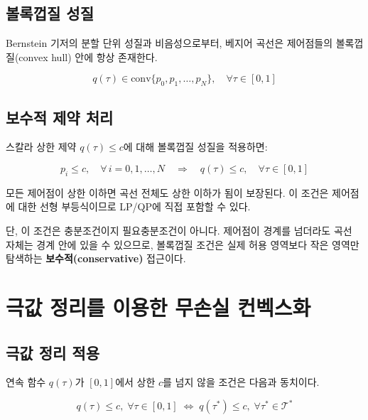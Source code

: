 \documentclass[11pt]{article}
\begin{document}
\subsection{볼록껍질 성질}

Bernstein 기저의 분할 단위 성질과 비음성으로부터,
베지어 곡선은 제어점들의 볼록껍질(convex hull) 안에 항상 존재한다.

\begin{equation}
  q(\tau) \in \mathrm{conv}\{p_0, p_1, \ldots, p_N\}, \quad \forall\tau\in[0,1]
  \label{eq:convex_hull}
\end{equation}

\subsection{보수적 제약 처리}

스칼라 상한 제약 $q(\tau) \leq c$에 대해 볼록껍질 성질을 적용하면:

\begin{equation}
  p_i \leq c,\quad \forall\, i = 0, 1, \ldots, N
  \quad \Rightarrow \quad q(\tau) \leq c,\quad \forall\tau\in[0,1]
  \label{eq:conservative}
\end{equation}

모든 제어점이 상한 이하면 곡선 전체도 상한 이하가 됨이 보장된다.
이 조건은 제어점에 대한 선형 부등식이므로 LP/QP에 직접 포함할 수 있다.

단, 이 조건은 충분조건이지 필요충분조건이 아니다.
제어점이 경계를 넘더라도 곡선 자체는 경계 안에 있을 수 있으므로,
볼록껍질 조건은 실제 허용 영역보다 작은 영역만 탐색하는
\textbf{보수적(conservative)} 접근이다.

\section{극값 정리를 이용한 무손실 컨벡스화}

\subsection{극값 정리 적용}

연속 함수 $q(\tau)$가 $[0,1]$에서 상한 $c$를 넘지 않을 조건은
다음과 동치이다.

\begin{equation}
  q(\tau) \leq c,\;\forall\tau\in[0,1]
  \;\Longleftrightarrow\;
  q(\tau^*) \leq c,\;\forall\tau^* \in \mathcal{T}^*
  \label{eq:extremum}
\end{equation}
\end{document}

